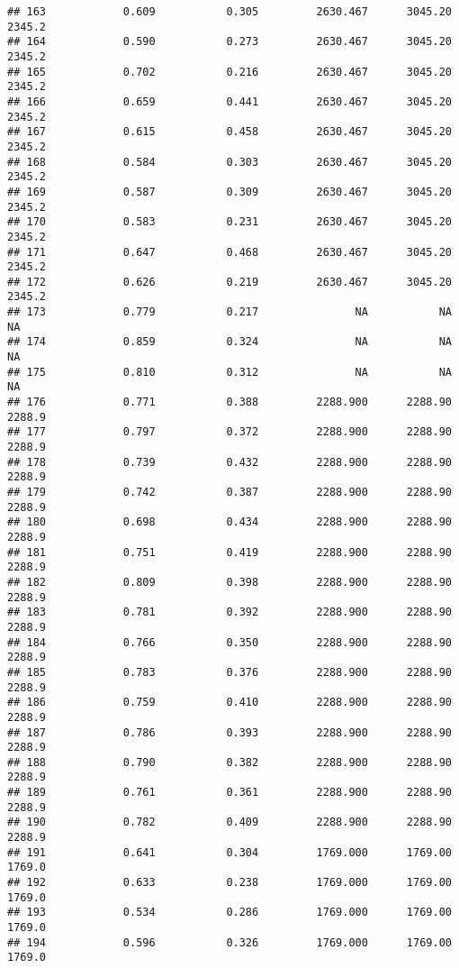 \documentclass[
]{article}
\begin{document}
\begin{verbatim}
## 163            0.609           0.305         2630.467      3045.20       2345.2
## 164            0.590           0.273         2630.467      3045.20       2345.2
## 165            0.702           0.216         2630.467      3045.20       2345.2
## 166            0.659           0.441         2630.467      3045.20       2345.2
## 167            0.615           0.458         2630.467      3045.20       2345.2
## 168            0.584           0.303         2630.467      3045.20       2345.2
## 169            0.587           0.309         2630.467      3045.20       2345.2
## 170            0.583           0.231         2630.467      3045.20       2345.2
## 171            0.647           0.468         2630.467      3045.20       2345.2
## 172            0.626           0.219         2630.467      3045.20       2345.2
## 173            0.779           0.217               NA           NA           NA
## 174            0.859           0.324               NA           NA           NA
## 175            0.810           0.312               NA           NA           NA
## 176            0.771           0.388         2288.900      2288.90       2288.9
## 177            0.797           0.372         2288.900      2288.90       2288.9
## 178            0.739           0.432         2288.900      2288.90       2288.9
## 179            0.742           0.387         2288.900      2288.90       2288.9
## 180            0.698           0.434         2288.900      2288.90       2288.9
## 181            0.751           0.419         2288.900      2288.90       2288.9
## 182            0.809           0.398         2288.900      2288.90       2288.9
## 183            0.781           0.392         2288.900      2288.90       2288.9
## 184            0.766           0.350         2288.900      2288.90       2288.9
## 185            0.783           0.376         2288.900      2288.90       2288.9
## 186            0.759           0.410         2288.900      2288.90       2288.9
## 187            0.786           0.393         2288.900      2288.90       2288.9
## 188            0.790           0.382         2288.900      2288.90       2288.9
## 189            0.761           0.361         2288.900      2288.90       2288.9
## 190            0.782           0.409         2288.900      2288.90       2288.9
## 191            0.641           0.304         1769.000      1769.00       1769.0
## 192            0.633           0.238         1769.000      1769.00       1769.0
## 193            0.534           0.286         1769.000      1769.00       1769.0
## 194            0.596           0.326         1769.000      1769.00       1769.0

\end{verbatim}
\end{document}
